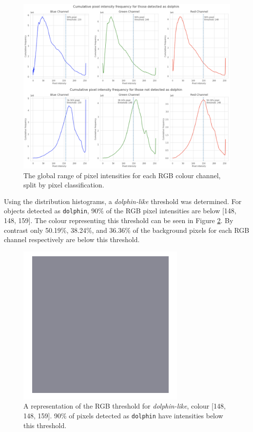 \begin{figure}
	\begin{center}
		\includegraphics[scale=0.8]{Chapter4/figs/histogram.png}
	\end{center}
	\caption{The global range of pixel intensities for each RGB colour channel, split by pixel classification.}\label{fig:global-histogram}
\end{figure}

Using the distribution histograms, a \textit{dolphin-like} threshold was determined. For objects detected as \texttt{dolphin}, 90\% of the RGB pixel intensities are below [148, 148, 159]. The colour representing this threshold can be seen in Figure \ref{fig:colour-threshold}. By contrast only 50.19\%, 38.24\%, and 36.36\% of the background pixels for each RGB channel respectively are below this threshold.
 
 \begin{figure}
 	\begin{center}
 		\includegraphics[scale=0.5]{Chapter4/figs/148-148-159.png}
 	\end{center}
 	\caption{A representation of the RGB threshold for \textit{dolphin-like}, colour [148, 148, 159]. 90\% of pixels detected as \texttt{dolphin} have intensities below this threshold.}\label{fig:colour-threshold}
 \end{figure}


